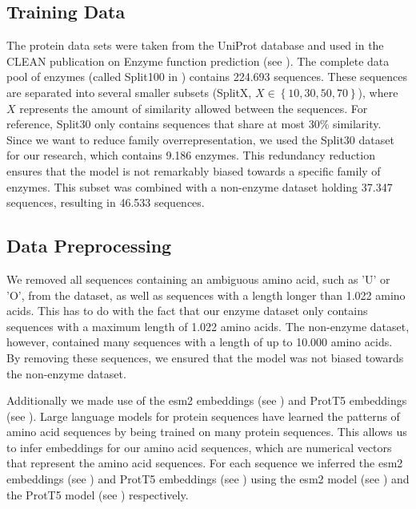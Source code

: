\documentclass{bioinfo}
\begin{document}
\begin{methods}
\subsection{Training Data}

The protein data sets were taken from the UniProt database and used in the CLEAN publication on Enzyme function prediction (see \cite{CleanArticle}). 
The complete data pool of enzymes (called Split100 in \cite{CleanArticle}) contains 224.693 sequences. 
These sequences are separated into several smaller subsets (SplitX, $X \in \left\{10, 30, 50, 70\right\}$), where $X$ represents the amount of similarity allowed between the sequences.
For reference, Split30 only contains sequences that share at most 30\% similarity.
Since we want to reduce family overrepresentation, we used the Split30 dataset for our research,
which contains 9.186 enzymes.
This redundancy reduction ensures that the model is not remarkably biased towards a specific family of enzymes.
This subset was combined with a non-enzyme dataset holding 37.347 sequences, resulting in 46.533 sequences.

\subsection{Data Preprocessing}
We removed all sequences containing an ambiguous amino acid, such as 'U' or 'O', from the dataset, as well as
sequences with a length longer than 1.022 amino acids. 
This has to do with the fact that our enzyme dataset only contains sequences with a maximum length of 1.022 amino acids.
The non-enzyme dataset, however, contained many sequences with a length of up to 10.000 amino acids.
By removing these sequences, we ensured that the model was not biased towards the non-enzyme dataset.

Additionally we made use of the esm2 embeddings (see \cite{ESM2}) and ProtT5 embeddings (see \cite{ProtT5}).
Large language models for protein sequences have learned the patterns of amino acid sequences by being trained on many protein sequences.
This allows us to infer embeddings for our amino acid sequences, which are numerical vectors that represent the amino acid sequences.
For each sequence we inferred the esm2 embeddings (see \cite{ESM2}) and ProtT5 embeddings (see \cite{ProtT5}) 
using the esm2 model (see \cite{ESM2}) and the ProtT5 model (see \cite{ProtT5}) respectively.



\end{methods}
\end{document}
